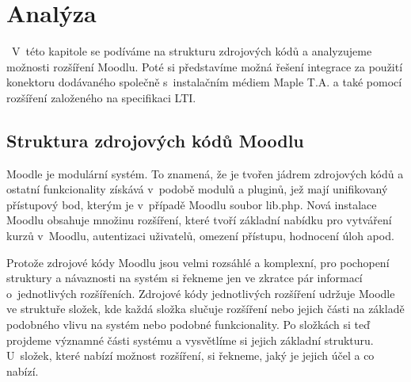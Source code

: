\documentclass[
print,
  11pt,
  table,   
  nolof,    
  nolot,
  oneside,final
]{fithesis3}
\begin{document}
\chapter{Analýza}\
V~této kapitole se podíváme na strukturu zdrojových kódů a analyzujeme možnosti rozšíření Moodlu. Poté si představíme možná řešení integrace za použití konektoru dodávaného společně s~instalačním médiem Maple T.A. a také pomocí rozšíření založeného na specifikaci LTI.
	\section{Struktura zdrojových kódů Moodlu}
Moodle je modulární systém. To znamená, že je tvořen jádrem zdrojových kódů a ostatní funkcionality získává v~podobě modulů a pluginů, jež mají unifikovaný přístupový bod, kterým je v~případě Moodlu soubor lib.php. Nová instalace Moodlu obsahuje množinu rozšíření, které tvoří základní nabídku pro vytváření kurzů v~Moodlu, autentizaci uživatelů, omezení přístupu, hodnocení úloh apod.

Protože zdrojové kódy Moodlu jsou velmi rozsáhlé a komplexní, pro pochopení struktury a návaznosti na systém si řekneme jen ve zkratce pár informací o~jednotlivých rozšířeních. Zdrojové kódy jednotlivých rozšíření udržuje Moodle ve struktuře složek, kde každá složka slučuje rozšíření nebo jejich části na základě podobného vlivu na systém nebo podobné funkcionality. Po složkách si teď projdeme významné části systému a vysvětlíme si jejich základní strukturu. U~složek, které nabízí možnost rozšíření, si řekneme, jaký je jejich účel a co nabízí.
\end{document}
